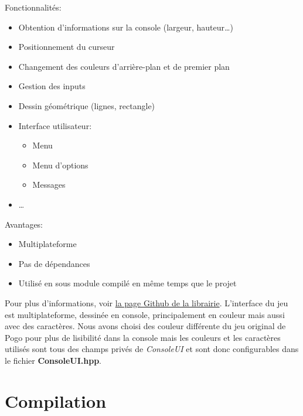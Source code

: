 \documentclass[article, backcover, french, nodocumentinfo]{upmethodology-document}
\begin{document}
					Fonctionnalités:
					\begin{itemize}
						\item Obtention d'informations sur la console (largeur, hauteur\ldots)
						\item Positionnement du curseur
						\item Changement des couleurs d'arrière-plan et de premier plan
						\item Gestion des inputs
						\item Dessin géométrique (lignes, rectangle)
						\item Interface utilisateur:
							\begin{itemize}
								\item Menu
								\item Menu d'options
								\item Messages
							\end{itemize}
						\item \ldots
					\end{itemize}
					Avantages:
					\begin{itemize}
						\item Multiplateforme
						\item Pas de dépendances
						\item Utilisé en sous module compilé en même temps que le projet
					\end{itemize}
					Pour plus d'informations, voir \href{https://github.com/pinam45/ConsoleControl}{la page Github de la librairie}.
					L'interface du jeu est multiplateforme, dessinée en console, principalement en couleur mais aussi avec des caractères. Nous avons choisi des couleur différente du jeu original de Pogo pour plus de lisibilité dans la console mais les couleurs et les caractères utilisés sont tous des champs privés de \textit{ConsoleUI} et sont donc configurables dans le fichier \textbf{ConsoleUI.hpp}.
	\section{Compilation}
\end{document}
